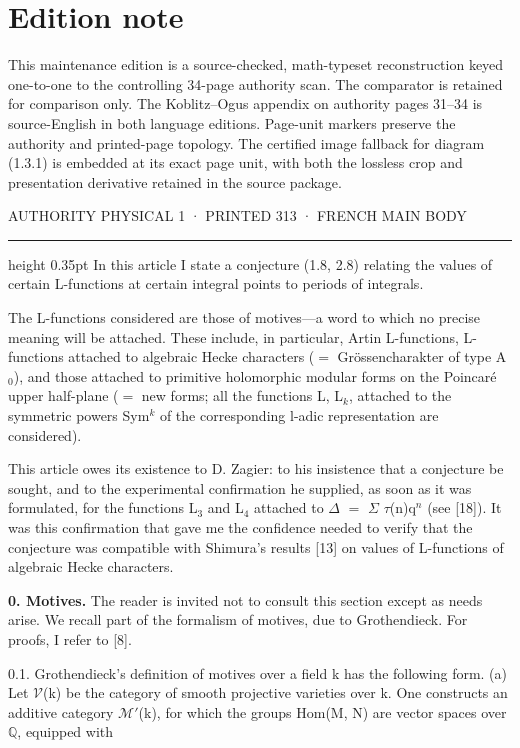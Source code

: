 \documentclass[10pt,twoside]{article}
\newcommand{\PageUnit}[3]{%
  \par\noindent\hypertarget{record-#1}{}%
  \pdfbookmark[1]{Authority page #1 · printed #2}{bookmark-#1}%
  {\sffamily\footnotesize\color{D030Muted}AUTHORITY PHYSICAL #1 · PRINTED #2 · #3}%
  \par\vspace{0.35em}\hrule height 0.35pt\vspace{0.8em}}
\newcommand{\SectionLead}[1]{\textbf{\color{D030Accent}#1}}
\begin{document}
\section*{Edition note}
This maintenance edition is a source-checked, math-typeset reconstruction keyed one-to-one to the controlling 34-page authority scan. The comparator is retained for comparison only. The Koblitz--Ogus appendix on authority pages 31--34 is source-English in both language editions. Page-unit markers preserve the authority and printed-page topology. The certified image fallback for diagram (1.3.1) is embedded at its exact page unit, with both the lossless crop and presentation derivative retained in the source package.
\clearpage
\PageUnit{1}{313}{FRENCH MAIN BODY}
In this article I state a conjecture (1.8, 2.8) relating the values of certain L-functions at certain integral points to periods of integrals.\par
The L-functions considered are those of motives—a word to which no precise meaning will be attached. These include, in particular, Artin L-functions, L-functions attached to algebraic Hecke characters (\ensuremath{=} Grössencharakter of type A\ensuremath{_{0}}), and those attached to primitive holomorphic modular forms on the Poincaré upper half-plane (\ensuremath{=} new forms; all the functions L, L\ensuremath{_{k}}, attached to the symmetric powers Sym\ensuremath{^{k}} of the corresponding l-adic representation are considered).\par
This article owes its existence to D. Zagier: to his insistence that a conjecture be sought, and to the experimental confirmation he supplied, as soon as it was formulated, for the functions L\ensuremath{_{3}} and L\ensuremath{_{4}} attached to \ensuremath{Δ} \ensuremath{=} \ensuremath{Σ} \ensuremath{τ}(n)q\ensuremath{^{n}} (see [18]). It was this confirmation that gave me the confidence needed to verify that the conjecture was compatible with Shimura’s results [13] on values of L-functions of algebraic Hecke characters.\par
\SectionLead{0. Motives.} The reader is invited not to consult this section except as needs arise. We recall part of the formalism of motives, due to Grothendieck. For proofs, I refer to [8].\par
0.1. Grothendieck’s definition of motives over a field k has the following form. (a) Let \ensuremath{𝒱}(k) be the category of smooth projective varieties over k. One constructs an additive category \ensuremath{ℳ}\ensuremath{′}(k), for which the groups Hom(M, N) are vector spaces over \ensuremath{ℚ}, equipped with\par
\end{document}
